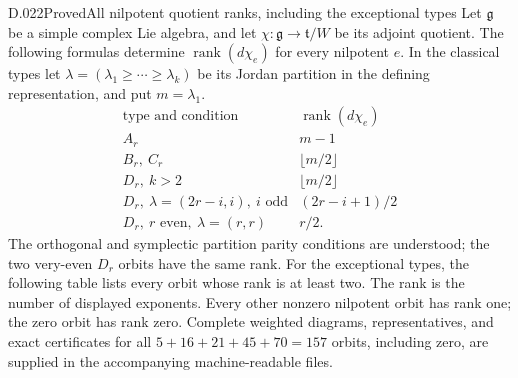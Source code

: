 \begin{saresult}{D.022}{Proved}{All nilpotent quotient ranks, including the exceptional types}
Let $\mathfrak g$ be a simple complex Lie algebra, and let
$\chi:\mathfrak g\longrightarrow\mathfrak t/W$ be its adjoint quotient.
The following formulas determine $\operatorname{rank}(d\chi_e)$ for every
nilpotent $e$.  In the classical types let
$\lambda=(\lambda_1\ge\cdots\ge\lambda_k)$ be its Jordan partition in
the defining representation, and put $m=\lambda_1$.
\[
\begin{array}{c|c}
\text{type and condition}&\operatorname{rank}(d\chi_e)\\\hline
 A_r&m-1\\
 B_r,\ C_r&\lfloor m/2\rfloor\\
 D_r,\ k>2&\lfloor m/2\rfloor\\
 D_r,\ \lambda=(2r-i,i),\ i\text{ odd}&(2r-i+1)/2\\
 D_r,\ r\text{ even},\ \lambda=(r,r)&r/2.
\end{array}                                                     \tag{D22.1}
\]
The orthogonal and symplectic partition parity conditions are understood;
the two very-even $D_r$ orbits have the same rank.
For the exceptional types, the following table lists every orbit whose
rank is at least two.  The rank is the number of displayed exponents.
Every other nonzero nilpotent orbit has rank one; the zero orbit has
rank zero.  Complete weighted diagrams, representatives, and exact
certificates for all $5+16+21+45+70=157$ orbits, including zero,
are supplied in the accompanying machine-readable files.
\end{saresult}



